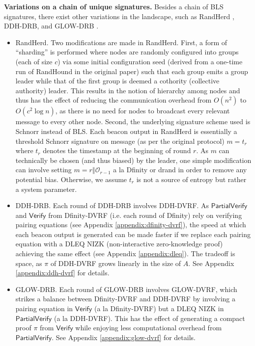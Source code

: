\documentclass[letterpaper,twocolumn,10pt]{article}
\theoremstyle{definition}
\theoremstyle{remark}
\begin{document}
\noindent\textbf{Variations on a chain of unique signatures.} Besides a chain of BLS signatures, there exist other variations in the landscape, such as RandHerd \cite{syta2017scalable}, DDH-DRB, and GLOW-DRB \cite{galindo2020fully}.
\begin{itemize}
\item RandHerd. Two modifications are made in RandHerd. First, a form of ``sharding'' is performed where nodes are randomly configured into groups (each of size $c$) via some initial configuration seed (derived from a one-time run of RandHound in the original paper) such that each group emits a group leader while that of the first group is deemed a cothority (collective authority) leader. This results in the notion of hierarchy among nodes and thus has the effect of reducing the communication overhead from $O(n^2)$ to $O(c^2 \log n)$, as there is no need for nodes to broadcast every relevant message to every other node. Second, the underlying signature scheme used is Schnorr instead of BLS. Each beacon output in RandHerd is essentially a threshold Schnorr signature on message (as per the original protocol) $m = t_r$ where $t_r$ denotes the timestamp at the beginning of round $r$. As $m$ can technically be chosen (and thus biased) by the leader, one simple modification can involve setting $m = r \mathbin\Vert \mathcal{O}_{r - 1}$ a la Dfinity or drand in order to remove any potential bias. Otherwise, we assume $t_r$ is not a source of entropy but rather a system parameter.
\item DDH-DRB. Each round of DDH-DRB involves DDH-DVRF. As $\mathsf{PartialVerify}$ and $\mathsf{Verify}$ from Dfinity-DVRF (i.e. each round of Dfinity) rely on verifying pairing equations (see Appendix \ref{appendix:dfinity-dvrf}), the speed at which each beacon output is generated can be made faster if we replace each pairing equation with a DLEQ NIZK (non-interactive zero-knowledge proof) achieving the same effect (see Appendix \ref{appendix:dleq}). The tradeoff is space, as $\pi$ of DDH-DVRF grows linearly in the size of $A$. See Appendix \ref{appendix:ddh-dvrf} for details.
\item GLOW-DRB. Each round of GLOW-DRB involves GLOW-DVRF, which strikes a balance between Dfinity-DVRF and DDH-DVRF by involving a pairing equation in $\mathsf{Verify}$ (a la Dfinity-DVRF) but a DLEQ NIZK in $\mathsf{PartialVerify}$ (a la DDH-DVRF). This has the effect of generating a compact proof $\pi$ from $\mathsf{Verify}$ while enjoying less computational overhead from $\mathsf{PartialVerify}$. See Appendix \ref{appendix:glow-dvrf} for details.
\end{itemize}
\end{document}
